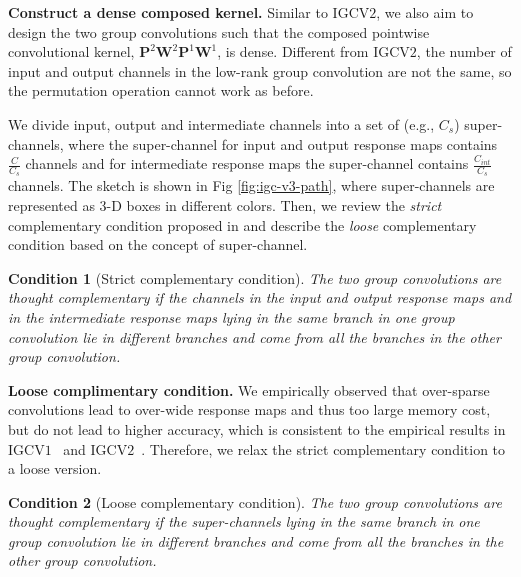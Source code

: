 \documentclass{bmvc2k}
\begin{document}
	\noindent\textbf{Construct a dense composed kernel.}
	Similar to IGCV$2$, we also aim to design the two group convolutions such that
	the composed pointwise convolutional kernel, $\mathbf{P}^2\mathbf{W}^2\mathbf{P}^1\mathbf{W}^1$, is dense. Different from IGCV$2$, the number of input and output channels in the low-rank group convolution are not the same, so the permutation operation cannot work as before.
	
	We divide input, output and intermediate channels into a set of (e.g., $C_s$) super-channels, where the super-channel for input and output response maps contains $\frac{C}{C_s}$ channels and for intermediate response maps the super-channel contains $\frac{C_{int}}{C_s}$ channels.
	The sketch is shown in Fig \ref{fig:igc-v3-path}, where super-channels are represented as 3-D boxes in different colors. 
	Then, we review the \emph{strict} complementary condition proposed in \cite{ISSC18} and describe the \emph{loose} complementary condition based on the concept of super-channel.
	
	\newtheorem{condition}{Condition}
	
	\begin{condition}[Strict complementary condition]
		The two group convolutions are thought complementary
		if
		the channels in the input and output response maps and 
		in the intermediate response maps  
		lying in the same branch
		in one group convolution
		lie in different branches
		and come from all the branches in the other group convolution.
	\end{condition}
	
	\noindent\textbf{Loose complimentary condition.} 
	We empirically observed that 
	over-sparse convolutions lead to over-wide response maps 
	and thus too large memory cost,
	but do not lead to higher accuracy,
	which is consistent to the empirical results in IGCV$1$~\cite{zhang2017interleaved} and IGCV$2$~\cite{ISSC18}.
	Therefore,
	we relax the strict complementary condition 
	to a loose version.
	\begin{condition}[Loose complementary condition]
		The two group convolutions are thought complementary
		if
		the super-channels lying in the same branch
		in one group convolution
		lie in different branches
		and come from all the branches in the other group convolution.
	\end{condition}
	
\end{document}

